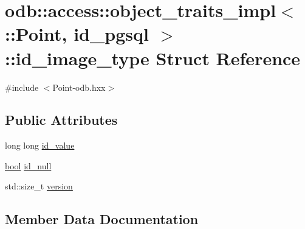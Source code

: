 \hypertarget{structodb_1_1access_1_1object__traits__impl_3_01_1_1_point_00_01id__pgsql_01_4_1_1id__image__type}{}\section{odb\+:\+:access\+:\+:object\+\_\+traits\+\_\+impl$<$ \+:\+:Point, id\+\_\+pgsql $>$\+:\+:id\+\_\+image\+\_\+type Struct Reference}
\label{structodb_1_1access_1_1object__traits__impl_3_01_1_1_point_00_01id__pgsql_01_4_1_1id__image__type}


{\ttfamily \#include $<$Point-\/odb.\+hxx$>$}

\subsection*{Public Attributes}
\begin{DoxyCompactItemize}
\item 
long long \hyperlink{structodb_1_1access_1_1object__traits__impl_3_01_1_1_point_00_01id__pgsql_01_4_1_1id__image__type_ab181a61520f0248513bad6f7d7aa8d00}{id\+\_\+value}
\item 
\hyperlink{classodb_1_1access_1_1object__traits_3_01_1_1_point_01_4_ab6e90357769eac9024011ae278acc043}{bool} \hyperlink{structodb_1_1access_1_1object__traits__impl_3_01_1_1_point_00_01id__pgsql_01_4_1_1id__image__type_ad48b176797409045235d07e7bd8c99ab}{id\+\_\+null}
\item 
std\+::size\+\_\+t \hyperlink{structodb_1_1access_1_1object__traits__impl_3_01_1_1_point_00_01id__pgsql_01_4_1_1id__image__type_a0e4ab5e57a2ef1099ba4df51ceab6f14}{version}
\end{DoxyCompactItemize}


\subsection{Member Data Documentation}
\hypertarget{structodb_1_1access_1_1object__traits__impl_3_01_1_1_point_00_01id__pgsql_01_4_1_1id__image__type_ad48b176797409045235d07e7bd8c99ab}{}
